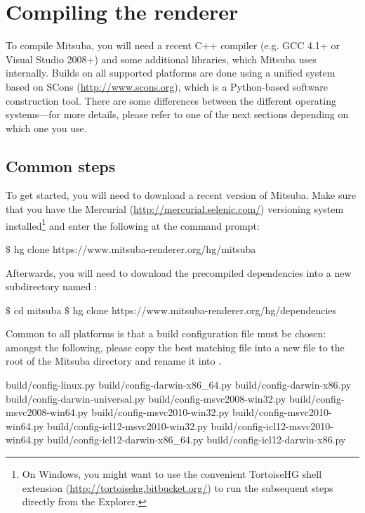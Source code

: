 \section{Compiling the renderer}
\label{sec:compiling}
To compile Mitsuba, you will need a recent C++ compiler (e.g. GCC 4.1+ or 
Visual Studio 2008+) and some additional libraries, which Mitsuba uses internally. 
Builds on all supported platforms are done using a unified system
based on SCons (\url{http://www.scons.org}), which is a Python-based 
software construction tool. There are some differences between the different operating systems---for
more details, please refer to one of the next sections depending on which one you use.

\subsection{Common steps}
To get started, you will need to download a recent version of Mitsuba. Make sure that you have the Mercurial (\url{http://mercurial.selenic.com/}) versioning system installed\footnote{On Windows, you might want to use the convenient TortoiseHG shell extension (\url{http://tortoisehg.bitbucket.org/}) to run the subsequent steps directly from the Explorer.} and enter the following at the command prompt:
\begin{shell}
$\texttt{\$}$ hg clone https://www.mitsuba-renderer.org/hg/mitsuba
\end{shell}
Afterwards, you will need to download the precompiled dependencies into a new
subdirectory named :
\begin{shell}
$\texttt{\$}$ cd mitsuba
$\texttt{\$}$ hg clone https://www.mitsuba-renderer.org/hg/dependencies
\end{shell}
Common to all platforms is that a build configuration file must be chosen: amongst the
following, please copy the best matching file into a new file to the root of the Mitsuba
directory and rename it into .
\begin{shell}
build/config-linux.py  
build/config-darwin-x86_64.py  
build/config-darwin-x86.py  
build/config-darwin-universal.py  
build/config-msvc2008-win32.py  
build/config-msvc2008-win64.py
build/config-msvc2010-win32.py  
build/config-msvc2010-win64.py
build/config-icl12-msvc2010-win32.py
build/config-icl12-msvc2010-win64.py
build/config-icl12-darwin-x86_64.py
build/config-icl12-darwin-x86.py
\end{shell}

